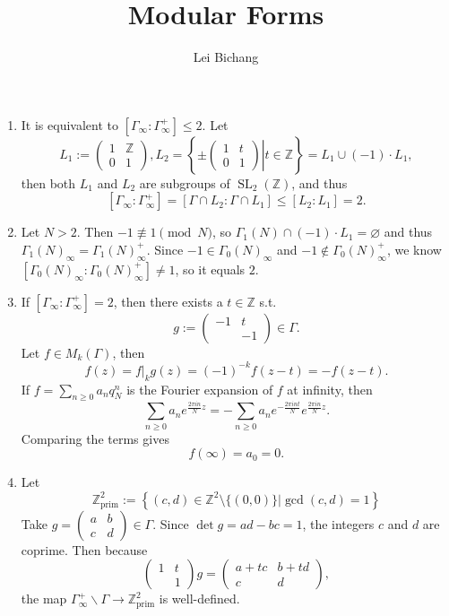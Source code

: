 \documentclass{article}
\title{Modular Forms}
\author{Lei Bichang}
\date{}
\theoremstyle{definition}
\theoremstyle{remark}
\newcommand{\Z}{\mathbb{Z}}
\DeclareMathOperator{\SL}{SL}
\newcommand{\prim}{\mathrm{prim}}
\begin{document}
\maketitle

\begin{enumerate}
\item It is equivalent to $[\Gamma_\infty : \Gamma_\infty^+]\le 2$. Let \[L_1 := \begin{pmatrix}
    1&\Z\\0&1
\end{pmatrix}, L_2 = \left\{ \left.\pm\begin{pmatrix}
    1&t\\0&1
\end{pmatrix}\right| t\in\Z \right\} = L_1\cup (-1)\cdot L_1,\]
then both $L_1$ and $L_2$ are subgroups of $\SL_2(\Z)$, and thus \[[\Gamma_\infty : \Gamma_\infty^+] = [\Gamma\cap L_2 : \Gamma\cap L_1]\le [L_2 : L_1] = 2.\]

\item 
Let $N > 2$.
Then $-1\not\equiv 1\pmod N$, so $\Gamma_1(N)\cap (-1)\cdot L_1 = \varnothing$ and thus $\Gamma_1(N)_\infty = \Gamma_1(N)_\infty^+$.
Since $-1\in\Gamma_0(N)_\infty$ and $-1\notin\Gamma_0(N)_\infty^+$, we know $[\Gamma_0(N)_\infty : \Gamma_0(N)_\infty^+] \ne 1$, so it equals $2$.


\item If $[\Gamma_\infty : \Gamma_\infty^+] = 2$, then there exists a $t\in\Z$ s.t. \[g := \begin{pmatrix}
    -1&t\\ &-1
\end{pmatrix}\in \Gamma.\]
Let $f\in M_k(\Gamma)$, then \[f(z) = f|_k g(z) = (-1)^{-k}f\left( z-t \right) = -f(z-t).\]
If $f = \sum_{n\ge 0}a_nq_N^n$ is the Fourier expansion of $f$ at infinity, then \[\sum_{n\ge 0}a_ne^{\frac{2\pi i n}{N}z} = -\sum_{n\ge 0}a_ne^{-\frac{2\pi i nt}{N}}e^{\frac{2\pi i n}{N}z}.\]
Comparing the terms gives \[f(\infty) = a_0 = 0.\]

\item Let \[\Z^2_\prim := \left\{(c, d)\in\Z^2\setminus \{(0, 0)\} | \gcd(c, d) = 1\right\}\] Take $g = \begin{pmatrix}
    a & b \\ c & d
\end{pmatrix}\in\Gamma$. Since $\det g = ad - bc = 1$, the integers $c$ and $d$ are coprime.
Then because \[\begin{pmatrix}
    1 & t \\ & 1
\end{pmatrix}g = \begin{pmatrix}
    a + tc&b+td\\c&d
\end{pmatrix},\] the map $\Gamma_\infty^+\backslash\Gamma\to \Z^2_\prim$ is well-defined.


\end{enumerate}
\end{document}
